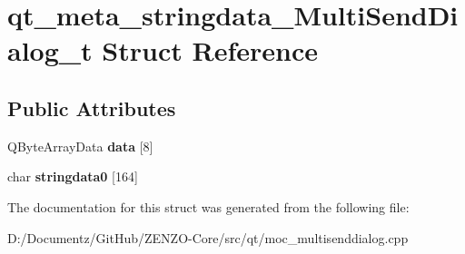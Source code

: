 \hypertarget{structqt__meta__stringdata___multi_send_dialog__t}{}\section{qt\+\_\+meta\+\_\+stringdata\+\_\+\+Multi\+Send\+Dialog\+\_\+t Struct Reference}
\label{structqt__meta__stringdata___multi_send_dialog__t}
\subsection*{Public Attributes}
\begin{DoxyCompactItemize}
\item 
\mbox{\label{structqt__meta__stringdata___multi_send_dialog__t_a3449b0a33ece9584690ae7336e67c5e0}} 
Q\+Byte\+Array\+Data {\bfseries data} \mbox{[}8\mbox{]}
\item 
\mbox{\label{structqt__meta__stringdata___multi_send_dialog__t_a089e3cedd4b9e22a27c2c626f01b0e6f}} 
char {\bfseries stringdata0} \mbox{[}164\mbox{]}
\end{DoxyCompactItemize}


The documentation for this struct was generated from the following file\+:\begin{DoxyCompactItemize}
\item 
D\+:/\+Documentz/\+Git\+Hub/\+Z\+E\+N\+Z\+O-\/\+Core/src/qt/moc\+\_\+multisenddialog.\+cpp\end{DoxyCompactItemize}
